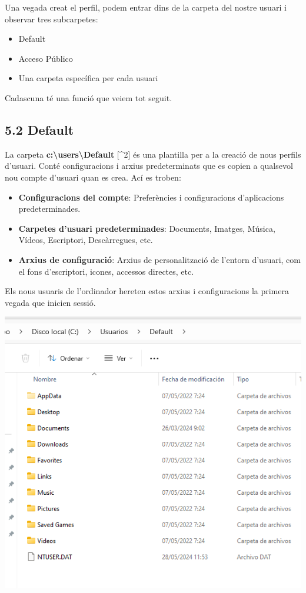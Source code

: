 \documentclass[
  a4paper,
]{article}
\providecommand{\tightlist}{%
  \setlength{\itemsep}{0pt}\setlength{\parskip}{0pt}}
\begin{document}
Una vegada creat el perfil, podem entrar dins de la carpeta del nostre
usuari i observar tres subcarpetes:

\begin{itemize}
\tightlist
\item
  Default
\item
  Acceso Público
\item
  Una carpeta específica per cada usuari
\end{itemize}

Cadascuna té una funció que veiem tot seguit.

\subsection{5.2 Default}\label{default}

La carpeta \textbf{c:\textbackslash users\textbackslash Default}
{[}\^{}2{]} és una plantilla per a la creació de nous perfils d'usuari.
Conté configuracions i arxius predeterminats que es copien a qualsevol
nou compte d'usuari quan es crea. Ací es troben:

\begin{itemize}
\tightlist
\item
  \textbf{Configuracions del compte}: Preferències i configuracions
  d'aplicacions predeterminades.
\item
  \textbf{Carpetes d'usuari predeterminades}: Documents, Imatges,
  Música, Vídeos, Escriptori, Descàrregues, etc.
\item
  \textbf{Arxius de configuració}: Arxius de personalització de l'entorn
  d'usuari, com el fons d'escriptori, icones, accessos directes, etc.
\end{itemize}

Els nous usuaris de l'ordinador hereten estos arxius i configuracions la
primera vegada que inicien sessió.

\includegraphics{png/CarpetesDefault.png}
\end{document}
